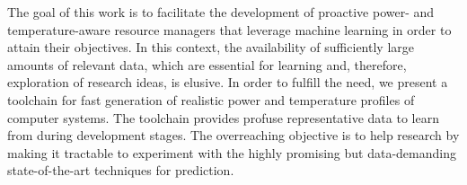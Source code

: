 The goal of this work is to facilitate the development of proactive
\mbox{power-} and temperature-aware resource managers that leverage machine
learning in order to attain their objectives. In this context, the availability
of sufficiently large amounts of relevant data, which are essential for learning
and, therefore, exploration of research ideas, is elusive. In order to fulfill
the need, we present a toolchain for fast generation of realistic power and
temperature profiles of computer systems. The toolchain provides profuse
representative data to learn from during development stages. The overreaching
objective is to help research by making it tractable to experiment with the
highly promising but data-demanding state-of-the-art techniques for prediction.
